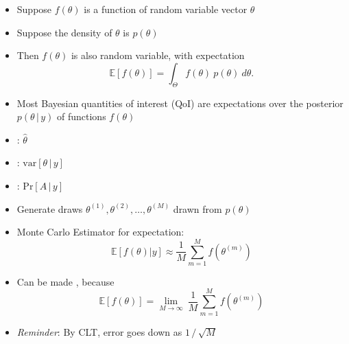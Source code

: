 \documentclass[10pt]{report}
\begin{document}
%
\begin{itemize}
\item Suppose $f(\theta)$ is a function of random variable vector
  $\theta$
\item Suppose the density of $\theta$ is $p(\theta)$
\item Then $f(\theta)$ is also random variable, with expectation
  \[
  \mathbb{E}[f(\theta)] = \int_{\Theta} f(\theta) \ p(\theta) \ d\theta.
  \]
\end{itemize}


%
\begin{itemize}
\item Most Bayesian quantities of interest (QoI) are expectations
  over the posterior $p(\theta \, | \, y)$ of functions $f(\theta)$
\item {}: $\hat{\theta}$
\item {}:
  $\mathrm{var}[\theta \, | \, y]$
\item {}:  $\mbox{Pr}[A \, | \, y]$
\end{itemize}


%
\begin{itemize}
\item Generate draws $\theta^{(1)}, \theta^{(2)}, \ldots,
  \theta^{(M)}$ drawn from $p(\theta)$
\item Monte Carlo Estimator  for expectation:
  \[
  \mathbb{E}[f(\theta)|y] \approx \frac{1}{M} \sum_{m=1}^M f(\theta^{(m)})
  \]
\item Can be made , because
\[
\mathbb{E}[f(\theta)] 
= 
\lim_{M \rightarrow \infty} \
\frac{1}{M} \sum_{m=1}^M f(\theta^{(m)})
\]
\vfill
\item {\slshape Reminder}:  By CLT, error goes down as
$1 \, / \, \sqrt{M}$
\end{itemize}
\end{document}
